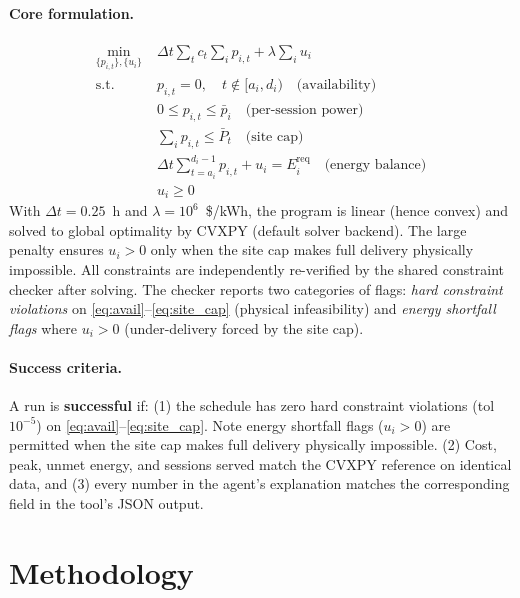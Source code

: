 \documentclass{article}
\begin{document}
\paragraph{Core formulation.}
\begin{align}
\min_{\{p_{i,t}\}, \{u_i\}} \;
  & \Delta t \sum_{t} c_t \sum_{i} p_{i,t} + \lambda \sum_{i} u_i \label{eq:obj_ev} \\
\text{s.t.}\quad
  & p_{i,t} = 0, \quad t \notin [a_i, d_i) \quad \text{(availability)} \label{eq:avail}\\
  & 0 \le p_{i,t} \le \bar{p}_i \quad \text{(per-session power)} \label{eq:per_session}\\
  & \textstyle\sum_{i} p_{i,t} \le \bar{P}_t \quad \text{(site cap)} \label{eq:site_cap}\\
  & \Delta t \sum_{t=a_i}^{d_i-1} p_{i,t} + u_i = E_i^{\text{req}} \quad \text{(energy balance)} \label{eq:energy_bal}\\
  & u_i \ge 0 \label{eq:unmet_nonneg}
\end{align}
With $\Delta t=0.25$~h and $\lambda=10^6$~\$/kWh, the program is linear (hence convex) and solved to global optimality by CVXPY (default solver backend). The large penalty ensures $u_i>0$ only when the site cap makes full delivery physically impossible. All constraints are independently re-verified by the shared constraint checker after solving. The checker reports two categories of flags: \emph{hard constraint violations} on \eqref{eq:avail}--\eqref{eq:site_cap} (physical infeasibility) and \emph{energy shortfall flags} where $u_i > 0$ (under-delivery forced by the site cap).

\paragraph{Success criteria.}
A run is \textbf{successful} if: (1) the schedule has zero hard constraint violations (tol $10^{-5}$) on \eqref{eq:avail}--\eqref{eq:site_cap}. Note energy shortfall flags ($u_i > 0$) are permitted when the site cap makes full delivery physically impossible. (2) Cost, peak, unmet energy, and sessions served match the CVXPY reference on identical data, and (3) every number in the agent's explanation matches the corresponding field in the tool's JSON output.

\section{Methodology}
\end{document}
